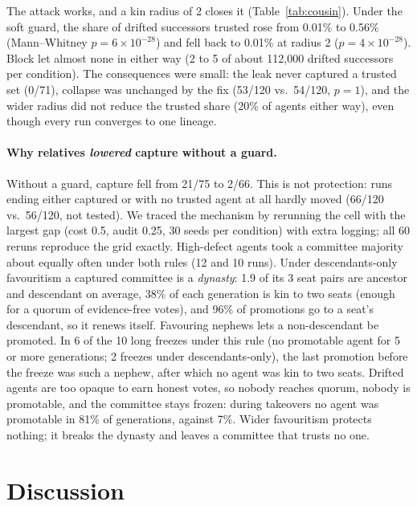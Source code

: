 \documentclass[11pt]{article}
\begin{document}
The attack works, and a kin radius of 2 closes it (Table~\ref{tab:cousin}). Under the soft
guard, the share of drifted successors trusted rose from 0.01\% to 0.56\%
(Mann--Whitney $p = 6\times10^{-28}$) and fell back to 0.01\% at radius 2
($p = 4\times10^{-28}$). Block let almost none in either way (2 to 5 of about 112{,}000
drifted successors per condition). The consequences were small: the leak never captured a
trusted set (0/71), collapse was unchanged by the fix (53/120 vs.\ 54/120, $p = 1$), and the
wider radius did not reduce the trusted share (20\% of agents either way), even though every
run converges to one lineage.

\paragraph{Why relatives \emph{lowered} capture without a guard.} Without a guard, capture
fell from 21/75 to 2/66. This is not protection: runs ending either captured or with no
trusted agent at all hardly moved (66/120 vs.\ 56/120, not tested). We traced the mechanism by
rerunning the cell with the largest gap (cost 0.5, audit 0.25, 30 seeds per condition) with
extra logging; all 60 reruns reproduce the grid exactly. High-defect agents took a committee
majority about equally often under both rules (12 and 10 runs). Under descendants-only
favouritism a captured committee is a \emph{dynasty}: 1.9 of its 3 seat pairs are ancestor and
descendant on average, 38\% of each generation is kin to two seats (enough for a quorum of
evidence-free votes), and 96\% of promotions go to a seat's descendant, so it renews itself.
Favouring nephews lets a non-descendant be promoted. In 6 of the 10 long freezes under this
rule (no promotable agent for 5 or more generations; 2 freezes under descendants-only), the
last promotion before the freeze was such a nephew, after which no agent was kin to two seats.
Drifted agents are too opaque to earn honest votes, so nobody reaches quorum, nobody is
promotable, and the committee stays frozen: during takeovers no agent was promotable in 81\%
of generations, against 7\%. Wider favouritism protects nothing; it breaks the dynasty and
leaves a committee that trusts no one.

\section{Discussion}
\label{sec:discussion}
\end{document}
